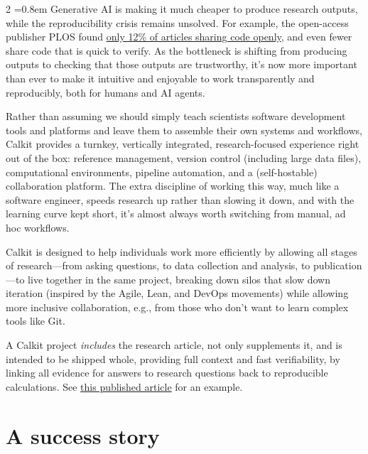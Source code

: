 \documentclass[10pt]{article}
\begin{document}
\begin{multicols}{2}
\fontsize{10.6}{14}\selectfont
\emergencystretch=0.8em
Generative AI is making it much cheaper to produce research outputs,
while the reproducibility crisis remains unsolved. For example, the
open-access publisher PLOS found
\href{https://doi.org/10.1371/journal.pone.0311493}{only 12\% of
articles sharing code openly}, and even fewer share code that is quick
to verify. As the bottleneck is shifting from producing outputs to
checking that those outputs are trustworthy, it's now more important
than ever to make it intuitive and enjoyable to work transparently and
reproducibly, both for humans and AI agents.

Rather than assuming we should simply teach scientists software
development tools and platforms and leave them to assemble their own
systems and workflows, Calkit provides a turnkey, vertically integrated,
research-focused experience right out of the box: reference management,
version control (including large data files), computational
environments, pipeline automation, and a (self-hostable) collaboration
platform. The extra discipline of working this way, much like a software
engineer, speeds research up rather than slowing it down, and with the
learning curve kept short, it's almost always worth switching from
manual, ad hoc workflows.

Calkit is designed to help individuals work more efficiently by allowing
all stages of research---from asking questions, to data collection and
analysis, to publication---to live together in the same project,
breaking down silos that slow down iteration (inspired by the Agile,
Lean, and DevOps movements) while allowing more inclusive collaboration,
e.g., from those who don't want to learn complex tools like Git.

A Calkit project \emph{includes} the research article, not only
supplements it, and is intended to be shipped whole, providing full
context and fast verifiability, by linking all evidence for answers to
research questions back to reproducible calculations. See
\href{https://doi.org/10.1088/1538-3873/ae6fef}{this published article}
for an example.

\section{A success story}\label{a-success-story}


\end{multicols}
\end{document}
